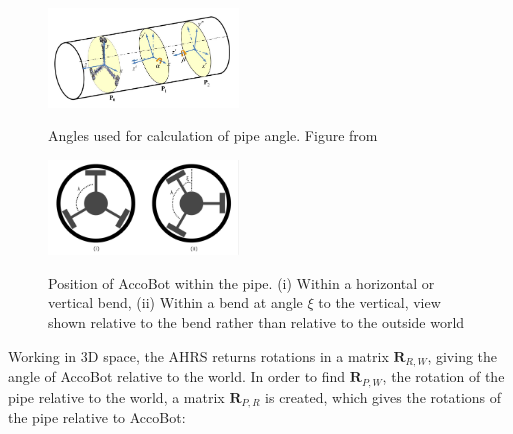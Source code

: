\documentclass[11pt]{article}		%
\begin{document}
			\begin{figure}[h]
				\centering
				\begin{multicols}{2}
				    \includegraphics[width = 0.45\textwidth]{pipeOrientation}
    				\caption{Angles used for calculation of pipe angle. Figure from \cite{park2010normal}}
    				\label{pipeOrientation}
    				\columnbreak
    				\includegraphics[width = 0.45\textwidth]{pipeAngle}
    				\caption{Position of AccoBot within the pipe. (i) Within a horizontal or vertical bend, (ii) Within a bend at angle $\xi$ to the vertical, view shown relative to the bend rather than relative to the outside world}
    				\label{pipeAngle}
				\end{multicols}
			\end{figure}
			
			Working in 3D space, the AHRS returns rotations in a matrix $\mathbf{R}_{R,W}$, giving the angle of AccoBot relative to the world.
			In order to find $\mathbf{R}_{P,W}$, the rotation of the pipe relative to the world, a matrix $\mathbf{R}_{P,R}$ is created, which gives the rotations of the pipe relative to AccoBot:
			
\end{document}
